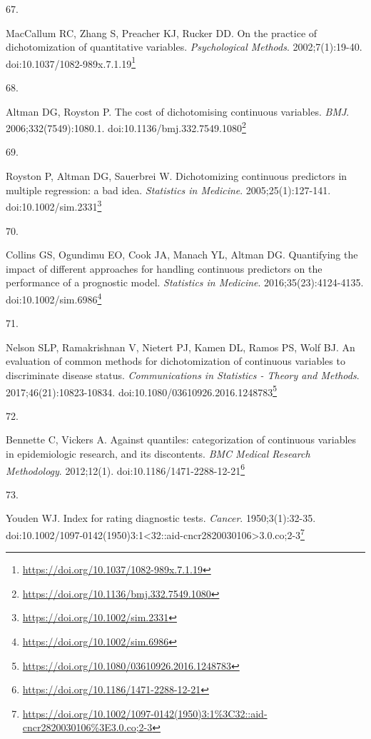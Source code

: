 \documentclass[
  a4paper,
]{book}
\newlength{\cslhangindent}
\newlength{\csllabelwidth}
\newlength{\cslentryspacingunit} %
\newenvironment{CSLReferences}[2] %
 {%
  \setlength{\parindent}{0pt}
  \ifodd #1
  \let\oldpar\par
  \def\par{\hangindent=\cslhangindent\oldpar}
  \fi
  \setlength{\parskip}{#2\cslentryspacingunit}
 }%
 {}
\newcommand{\CSLLeftMargin}[1]{\parbox[t]{\csllabelwidth}{#1}}
\newcommand{\CSLRightInline}[1]{\parbox[t]{\linewidth - \csllabelwidth}{#1}\break}
\renewcommand{\href}[2]{#2\footnote{\url{#1}}}
\begin{document}
\begin{CSLReferences}{0}{0}
\leavevmode{}%
\CSLLeftMargin{67. }%
\CSLRightInline{MacCallum RC, Zhang S, Preacher KJ, Rucker DD. On the practice of dichotomization of quantitative variables. \emph{Psychological Methods}. 2002;7(1):19-40. doi:\href{https://doi.org/10.1037/1082-989x.7.1.19}{10.1037/1082-989x.7.1.19}}

\leavevmode{}%
\CSLLeftMargin{68. }%
\CSLRightInline{Altman DG, Royston P. The cost of dichotomising continuous variables. \emph{BMJ}. 2006;332(7549):1080.1. doi:\href{https://doi.org/10.1136/bmj.332.7549.1080}{10.1136/bmj.332.7549.1080}}

\leavevmode{}%
\CSLLeftMargin{69. }%
\CSLRightInline{Royston P, Altman DG, Sauerbrei W. Dichotomizing continuous predictors in multiple regression: a bad idea. \emph{Statistics in Medicine}. 2005;25(1):127-141. doi:\href{https://doi.org/10.1002/sim.2331}{10.1002/sim.2331}}

\leavevmode{}%
\CSLLeftMargin{70. }%
\CSLRightInline{Collins GS, Ogundimu EO, Cook JA, Manach YL, Altman DG. Quantifying the impact of different approaches for handling continuous predictors on the performance of a prognostic model. \emph{Statistics in Medicine}. 2016;35(23):4124-4135. doi:\href{https://doi.org/10.1002/sim.6986}{10.1002/sim.6986}}

\leavevmode{}%
\CSLLeftMargin{71. }%
\CSLRightInline{Nelson SLP, Ramakrishnan V, Nietert PJ, Kamen DL, Ramos PS, Wolf BJ. An evaluation of common methods for dichotomization of continuous variables to discriminate disease status. \emph{Communications in Statistics - Theory and Methods}. 2017;46(21):10823-10834. doi:\href{https://doi.org/10.1080/03610926.2016.1248783}{10.1080/03610926.2016.1248783}}

\leavevmode{}%
\CSLLeftMargin{72. }%
\CSLRightInline{Bennette C, Vickers A. Against quantiles: categorization of continuous variables in epidemiologic research, and its discontents. \emph{BMC Medical Research Methodology}. 2012;12(1). doi:\href{https://doi.org/10.1186/1471-2288-12-21}{10.1186/1471-2288-12-21}}

\leavevmode{}%
\CSLLeftMargin{73. }%
\CSLRightInline{Youden WJ. Index for rating diagnostic tests. \emph{Cancer}. 1950;3(1):32-35. doi:\href{https://doi.org/10.1002/1097-0142(1950)3:1\%3C32::aid-cncr2820030106\%3E3.0.co;2-3}{10.1002/1097-0142(1950)3:1\textless32::aid-cncr2820030106\textgreater3.0.co;2-3}}


\end{CSLReferences}
\end{document}
